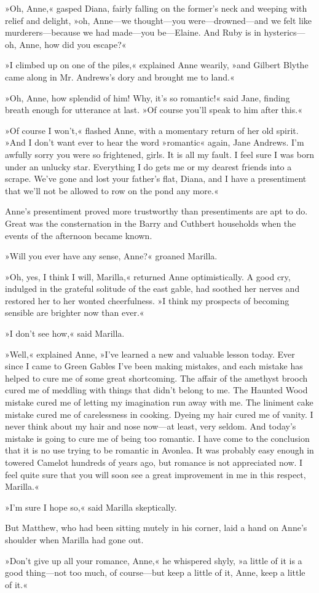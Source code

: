 »Oh, Anne,« gasped Diana, fairly falling on the former's neck and weeping with relief and delight, »oh, Anne—we thought—you were—drowned—and we felt like murderers—because we had made—you be—Elaine. And Ruby is in hysterics—oh, Anne, how did you escape?«

»I climbed up on one of the piles,« explained Anne wearily, »and Gilbert Blythe came along in Mr. Andrews's dory and brought me to land.«

»Oh, Anne, how splendid of him! Why, it's so romantic!« said Jane, finding breath enough for utterance at last. »Of course you'll speak to him after this.«

»Of course I won't,« flashed Anne, with a momentary return of her old spirit. »And I don't want ever to hear the word »romantic« again, Jane Andrews. I'm awfully sorry you were so frightened, girls. It is all my fault. I feel sure I was born under an unlucky star. Everything I do gets me or my dearest friends into a scrape. We've gone and lost your father's flat, Diana, and I have a presentiment that we'll not be allowed to row on the pond any more.«

Anne's presentiment proved more trustworthy than presentiments are apt to do. Great was the consternation in the Barry and Cuthbert households when the events of the afternoon became known.

»Will you ever have any sense, Anne?« groaned Marilla.

»Oh, yes, I think I will, Marilla,« returned Anne optimistically. A good cry, indulged in the grateful solitude of the east gable, had soothed her nerves and restored her to her wonted cheerfulness. »I think my prospects of becoming sensible are brighter now than ever.«

»I don't see how,« said Marilla.

»Well,« explained Anne, »I've learned a new and valuable lesson today. Ever since I came to Green Gables I've been making mistakes, and each mistake has helped to cure me of some great shortcoming. The affair of the amethyst brooch cured me of meddling with things that didn't belong to me. The Haunted Wood mistake cured me of letting my imagination run away with me. The liniment cake mistake cured me of carelessness in cooking. Dyeing my hair cured me of vanity. I never think about my hair and nose now—at least, very seldom. And today's mistake is going to cure me of being too romantic. I have come to the conclusion that it is no use trying to be romantic in Avonlea. It was probably easy enough in towered Camelot hundreds of years ago, but romance is not appreciated now. I feel quite sure that you will soon see a great improvement in me in this respect, Marilla.«

»I'm sure I hope so,« said Marilla skeptically.

But Matthew, who had been sitting mutely in his corner, laid a hand on Anne's shoulder when Marilla had gone out.

»Don't give up all your romance, Anne,« he whispered shyly, »a little of it is a good thing—not too much, of course—but keep a little of it, Anne, keep a little of it.«